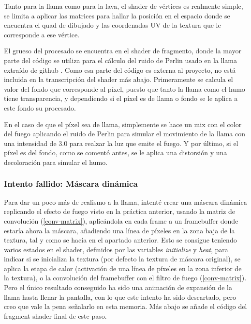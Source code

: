 \documentclass[12pt]{article}%
\begin{document}
	Tanto para la llama como para la lava, el shader de vértices es realmente simple, se limita a aplicar las matrices para hallar la posición en el espacio donde se encuentra el quad de dibujado y las coordenadas UV de la textura que le corresponde a ese vértice.

%

	El grueso del procesado se encuentra en el shader de fragmento, donde la mayor parte del código se utiliza para el cálculo del ruido de Perlin usado en la llama extraído de github \cite{perlin-wlgl}. Como esa parte del código es externa al proyecto, no está incluida en la transcripción del shader más abajo. Primeramente se calcula el valor del fondo que corresponde al píxel, puesto que tanto la llama como el humo tiene transparencia, y dependiendo si el píxel es de llama o fondo se le aplica a este fondo su procesado.
	
	En el caso de que el píxel sea de llama, simplemente se hace un mix con el color del fuego aplicando el ruido de Perlin para simular el movimiento de la llama con una intensidad de $3.0$ para realzar la luz que emite el fuego. Y por último, si el píxel es del fondo, como se comentó antes, se le aplica una distorsión y una decoloración para simular el humo.

%

\subsubsection{Intento fallido: Máscara dinámica}
	
		Para dar un poco más de realismo a la llama, intenté crear una máscara dinámica replicando el efecto de fuego visto en la práctica anterior, usando la matriz de convolución (\ref{conv-matrix}), aplicándola en cada frame a un framebuffer donde estaría ahora la máscara, añadiendo una línea de píxeles en la zona baja de la textura, tal y como se hacía en el apartado anterior. Esto se consigue teniendo varios estados en el shader, definidos por las variables \textit{initialize} y \textit{heat}, para indicar si se inicializa la textura (por defecto la textura de máscara original), se aplica la etapa de calor (activación de una línea de píxeles en la zona inferior de la textura), o la convolución del framebuffer con el filtro de fuego (\ref{conv-matrix}). Pero el único resultado conseguido ha sido una animación de expansión de la llama hasta llenar la pantalla, con lo que este intento ha sido descartado, pero creo que vale la pena señalarlo en esta memoria. Más abajo se añade el código del fragment shader final de este paso.
	
\end{document}
